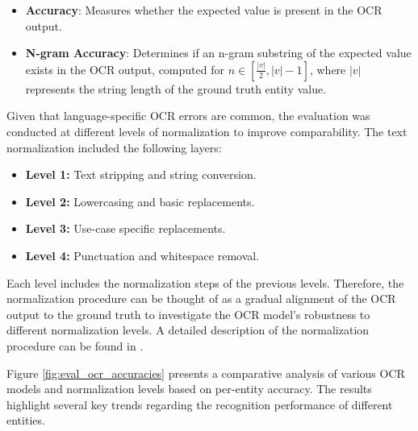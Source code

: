 \documentclass[11pt]{article}
\begin{document}
\begin{itemize}
    \item \textbf{Accuracy}: Measures whether the expected value is present in the OCR output.
    \item \textbf{N-gram Accuracy}: Determines if an n-gram substring of the expected value exists in the OCR output, computed for $n \in \left[\frac{|v|}{2}, |v| - 1\right]$, where $|v|$ represents the string length of the ground truth entity value.
\end{itemize}

Given that language-specific OCR errors are common, the evaluation was conducted at different levels of normalization to improve comparability. The text normalization included the following layers:
\begin{itemize}
    \item \textbf{Level 1:} Text stripping and string conversion.
    \item \textbf{Level 2:} Lowercasing and basic replacements.
    \item \textbf{Level 3:} Use-case specific replacements.
    \item \textbf{Level 4:} Punctuation and whitespace removal.
\end{itemize}
Each level includes the normalization steps of the previous levels. Therefore, the normalization procedure can be thought of as a gradual alignment of the OCR output to the ground truth to investigate the OCR model's robustness to different normalization levels. A detailed description of the normalization procedure can be found in .

 Figure \ref{fig:eval_ocr_accuracies} presents a comparative analysis of various OCR models and normalization levels based on per-entity accuracy. The results highlight several key trends regarding the recognition performance of different entities.
\end{document}
